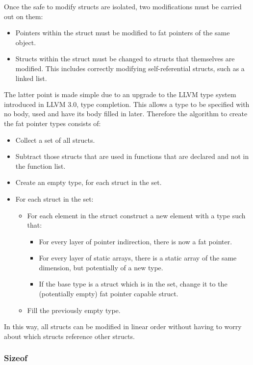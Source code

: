 Once the safe to modify structs are isolated, two modifications must be carried out on them:

\begin{itemize}
\item Pointers within the struct must be modified to fat pointers of the same object.
\item Structs within the struct must be changed to structs that themselves are modified.
This includes correctly modifying self-referential structs, such as a linked list.
\end{itemize}

The latter point is made simple due to an upgrade to the LLVM type system introduced in LLVM 3.0, type completion.
This allows a type to be specified with no body, used and have its body filled in later.
Therefore the algorithm to create the fat pointer types consists of:

\begin{itemize}
\item Collect a set of all structs.
\item Subtract those structs that are used in functions that are declared and not in the function list.
\item Create an empty type, for each struct in the set.
\item For each struct in the set:
\begin{itemize}
\item For each element in the struct construct a new element with a type such that:
\begin{itemize}
\item For every layer of pointer indirection, there is now a fat pointer.
\item For every layer of static arrays, there is a static array of the same dimension, but potentially of a new type.
\item If the base type is a struct which is in the set, change it to the (potentially empty) fat pointer capable struct.
\end{itemize}
\item Fill the previously empty type.
\end{itemize}
\end{itemize}

In this way, all structs can be modified in linear order without having to worry about which structs reference other structs.
	
\subsubsection{Sizeof}

